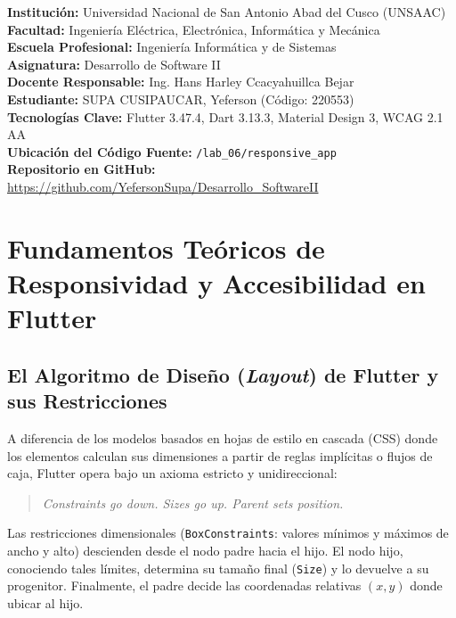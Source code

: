 \documentclass[12pt,a4paper]{article}
\begin{document}
\begin{tcolorbox}[colback=calloutbg,colframe=calloutborder,title=\textbf{Ficha Técnica de la Práctica 06}]
\textbf{Institución:} Universidad Nacional de San Antonio Abad del Cusco (UNSAAC)\\
\textbf{Facultad:} Ingeniería Eléctrica, Electrónica, Informática y Mecánica\\
\textbf{Escuela Profesional:} Ingeniería Informática y de Sistemas\\
\textbf{Asignatura:} Desarrollo de Software II\\
\textbf{Docente Responsable:} Ing. Hans Harley Ccacyahuillca Bejar\\
\textbf{Estudiante:} SUPA CUSIPAUCAR, Yeferson (Código: 220553)\\
\textbf{Tecnologías Clave:} Flutter 3.47.4, Dart 3.13.3, Material Design 3, WCAG 2.1 AA\\
\textbf{Ubicación del Código Fuente:} \texttt{/lab\_06/responsive_app}\\
\textbf{Repositorio en GitHub:} \url{https://github.com/YefersonSupa/Desarrollo_SoftwareII}
\end{tcolorbox}

\section{Fundamentos Teóricos de Responsividad y Accesibilidad en Flutter}

\subsection{El Algoritmo de Diseño (\textit{Layout}) de Flutter y sus Restricciones}
A diferencia de los modelos basados en hojas de estilo en cascada (CSS) donde los elementos calculan sus dimensiones a partir de reglas implícitas o flujos de caja, Flutter opera bajo un axioma estricto y unidireccional:
\begin{quote}
\textit{Constraints go down. Sizes go up. Parent sets position.}
\end{quote}
Las restricciones dimensionales (\texttt{BoxConstraints}: valores mínimos y máximos de ancho y alto) descienden desde el nodo padre hacia el hijo. El nodo hijo, conociendo tales límites, determina su tamaño final (\texttt{Size}) y lo devuelve a su progenitor. Finalmente, el padre decide las coordenadas relativas $(x, y)$ donde ubicar al hijo.
\end{document}
